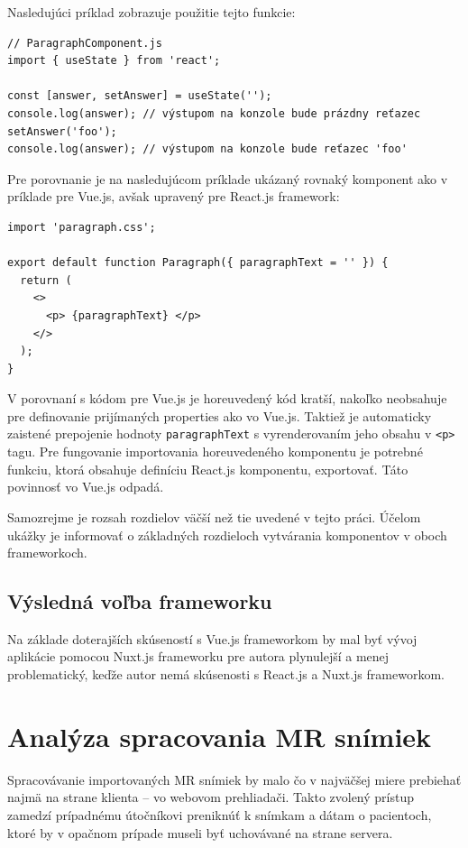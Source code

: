\clearpage

Nasledujúci príklad zobrazuje použitie tejto funkcie:

\begin{minipage}[]{\linewidth}
\begin{verbatim}
// ParagraphComponent.js
import { useState } from 'react';

const [answer, setAnswer] = useState('');
console.log(answer); // výstupom na konzole bude prázdny reťazec
setAnswer('foo');
console.log(answer); // výstupom na konzole bude reťazec 'foo'
\end{verbatim}
\end{minipage}

Pre porovnanie je na nasledujúcom príklade ukázaný rovnaký komponent ako v príklade pre Vue.js, avšak upravený pre React.js framework:

\begin{minipage}[]{\linewidth}
\begin{verbatim}
import 'paragraph.css';

export default function Paragraph({ paragraphText = '' }) {
  return (
    <>
      <p> {paragraphText} </p>
    </>
  );
}
\end{verbatim}
\end{minipage}

V porovnaní s kódom pre Vue.js je horeuvedený kód kratší, nakoľko neobsahuje  pre definovanie prijímaných properties ako vo Vue.js. Taktiež je automaticky zaistené prepojenie hodnoty \texttt{paragraphText} s vyrenderovaním jeho obsahu v \texttt{<p>} tagu. Pre fungovanie importovania horeuvedeného komponentu je potrebné funkciu, ktorá obsahuje definíciu React.js komponentu, exportovať. Táto povinnosť vo Vue.js odpadá.

Samozrejme je rozsah rozdielov väčší než tie uvedené v tejto práci. Účelom ukážky je informovať o základných rozdieloch vytvárania komponentov v oboch frameworkoch.

\subsection {Výsledná voľba frameworku}
Na základe doterajších skúseností s Vue.js frameworkom by mal byť vývoj aplikácie pomocou Nuxt.js frameworku pre autora plynulejší a menej problematický, keďže autor nemá skúsenosti s React.js a Nuxt.js frameworkom.

\clearpage

\section {Analýza spracovania MR snímiek}
Spracovávanie importovaných MR snímiek by malo čo v najväčšej miere prebiehať najmä na strane klienta -- vo webovom prehliadači. Takto zvolený prístup zamedzí prípadnému útočníkovi preniknúť k snímkam a dátam o pacientoch, ktoré by v opačnom prípade museli byť uchovávané na strane servera.

